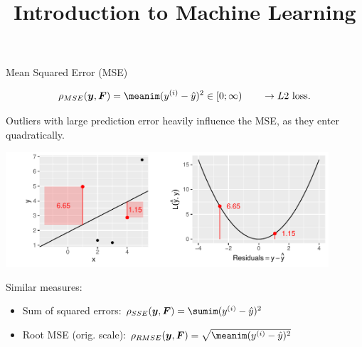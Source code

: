





\newcommand{\titlefigure}{figure_man/plot_title_eval_regr}
\newcommand{\learninggoals}{
\item Know the definitions of mean squared error (MSE) and mean absolute error (MAE)
\item Understand the connections of MSE and MAE to L2 and L1 loss
\item Know the definition of Spearman's $\rho$
\item Know the definitions of $R^2$ and generalized $R^2$}


\title{Introduction to Machine Learning}
\date{}



\sloppy


\begin{vbframe}{Mean Squared Error (MSE)}

$$
\rho_{MSE}(\yv, \F) = \meanim (\yi - \yih)^2 \in [0;\infty) \qquad \rightarrow L2 \text{ loss}.
$$

\begin{minipage}[c]{0.33\textwidth}
  \raggedright
  \small
  Outliers with large prediction error heavily influence the MSE, as they 
  enter quadratically.
\end{minipage}%
\begin{minipage}[c]{0.67\textwidth}
  \begin{knitrout}\scriptsize
  \color{fgcolor}
  {\includegraphics[width=0.9\textwidth]{figure/plot_quad_loss}}
\end{knitrout}
\end{minipage}

\small
Similar measures:

\begin{itemize}
  \small
  \item Sum of squared errors: $\rho_{SSE}(\yv, \F)=\sumim (\yi - \yih)^2$
  \item Root MSE (orig. scale): $\rho_{RMSE}(\yv, \F)= \sqrt{\meanim (\yi - \yih)^2}$
\end{itemize}

\end{vbframe}

